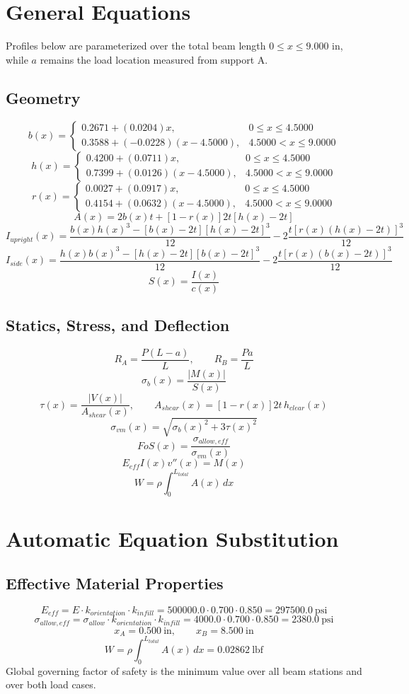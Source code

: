 \documentclass[11pt]{article}
\begin{document}
\section*{General Equations}
Profiles below are parameterized over the total beam length $0 \le x \le 9.000$ in, while $a$ remains the load location measured from support A.
\subsection*{Geometry}
\[
b(x)=\begin{cases}0.2671 + (0.0204)x, & 0 \le x \le 4.5000\\0.3588 + (-0.0228)(x-4.5000), & 4.5000 < x \le 9.0000\end{cases}
\]
\[
h(x)=\begin{cases}0.4200 + (0.0711)x, & 0 \le x \le 4.5000\\0.7399 + (0.0126)(x-4.5000), & 4.5000 < x \le 9.0000\end{cases}
\]
\[
r(x)=\begin{cases}0.0027 + (0.0917)x, & 0 \le x \le 4.5000\\0.4154 + (0.0632)(x-4.5000), & 4.5000 < x \le 9.0000\end{cases}
\]
\[
A(x)=2b(x)t+[1-r(x)]2t[h(x)-2t]
\]
\[
I_{upright}(x)=\frac{b(x)h(x)^3-[b(x)-2t][h(x)-2t]^3}{12}-2\frac{t[r(x)(h(x)-2t)]^3}{12}
\]
\[
I_{side}(x)=\frac{h(x)b(x)^3-[h(x)-2t][b(x)-2t]^3}{12}-2\frac{t[r(x)(b(x)-2t)]^3}{12}
\]
\[
S(x)=\frac{I(x)}{c(x)}
\]

\subsection*{Statics, Stress, and Deflection}
\[
R_A=\frac{P(L-a)}{L}, \qquad R_B=\frac{Pa}{L}
\]
\[
\sigma_b(x)=\frac{|M(x)|}{S(x)}
\]
\[
\tau(x)=\frac{|V(x)|}{A_{shear}(x)}, \qquad A_{shear}(x)=[1-r(x)]2t\,h_{clear}(x)
\]
\[
\sigma_{vm}(x)=\sqrt{\sigma_b(x)^2+3\tau(x)^2}
\]
\[
FoS(x)=\frac{\sigma_{allow,eff}}{\sigma_{vm}(x)}
\]
\[
E_{eff}I(x)v''(x)=M(x)
\]
\[
W=\rho\int_0^{L_{total}} A(x)\,dx
\]

\section*{Automatic Equation Substitution}
\subsection*{Effective Material Properties}
\[E_{eff} = E \cdot k_{orientation} \cdot k_{infill} = 500000.0 \cdot 0.700 \cdot 0.850 = 297500.0\ \mathrm{psi}\]
\[\sigma_{allow,eff} = \sigma_{allow} \cdot k_{orientation} \cdot k_{infill} = 4000.0 \cdot 0.700 \cdot 0.850 = 2380.0\ \mathrm{psi}\]
\[x_A = 0.500\ \mathrm{in}, \qquad x_B = 8.500\ \mathrm{in}\]
\[W = \rho \int_0^{L_{total}} A(x)\,dx = 0.02862\ \mathrm{lbf}\]
Global governing factor of safety is the minimum value over all beam stations and over both load cases.
\end{document}

